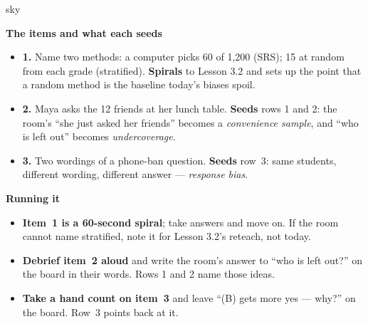 \documentclass[10pt]{article}
\begin{document}
\boxguard[20]
\begin{skillbox}{sky}
\begin{minipage}[t]{0.48\linewidth}
    \textbf{The items and what each seeds}
    \begin{itemize}
        \item \textbf{1.} Name two methods: a computer picks 60 of 1{,}200 (SRS); 15 at random
              from each grade (stratified). \textbf{Spirals} to Lesson 3.2 and sets up the
              point that a random method is the baseline today's biases spoil.
        \item \textbf{2.} Maya asks the 12 friends at her lunch table. \textbf{Seeds} rows 1
              and 2: the room's ``she just asked her friends'' becomes a \emph{convenience
              sample}, and ``who is left out'' becomes \emph{undercoverage}.
        \item \textbf{3.} Two wordings of a phone-ban question. \textbf{Seeds} row~3: same
              students, different wording, different answer --- \emph{response bias}.
    \end{itemize}
\end{minipage}
\hfill
\begin{minipage}[t]{0.48\linewidth}
    \textbf{Running it}
    \begin{itemize}
        \item \textbf{Item~1 is a 60-second spiral}; take answers and move on. If the room
              cannot name stratified, note it for Lesson 3.2's reteach, not today.
        \item \textbf{Debrief item~2 aloud} and write the room's answer to ``who is left out?''
              on the board in their words. Rows 1 and 2 name those ideas.
        \item \textbf{Take a hand count on item~3} and leave ``(B) gets more yes --- why?'' on
              the board. Row~3 points back at it.
    \end{itemize}
\end{minipage}
\end{skillbox}
\end{document}
